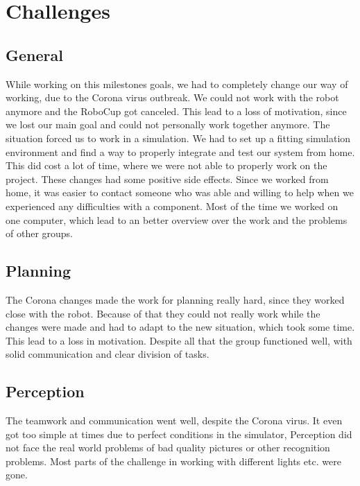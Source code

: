 \documentclass[main.tex]{subfiles}
\begin{document}
	
	\chapter{Challenges}

\section{General}

While working on this milestones goals, we had to completely change our way of working, due to the Corona virus outbreak.
We could not work with the robot anymore and the RoboCup got canceled. This lead to a loss of motivation, since we lost our main goal and could not personally work together anymore.
The situation forced us to work in a simulation. We had to set up a fitting simulation environment and find a way to properly integrate and test our system from home. This did cost a lot of time, where we were not able to properly work on the project.
These changes had some positive side effects. Since we worked from home, it was easier to contact someone who was able and willing to help when we experienced any difficulties with a component. Most of the time we worked on one computer, which lead to an better overview over the work and the problems of other groups.

\section{Planning}

The Corona changes made the work for planning really hard, since they worked close with the robot. Because of that they could not really work while the changes were made and had to adapt to the new situation, which took some time.
This lead to a loss in motivation. Despite all that the group functioned well, with solid communication and clear division of tasks.

\section{Perception}

The teamwork and communication went well, despite the Corona virus. It even got too simple at times due to perfect conditions in the simulator, Perception did not face the real world problems of bad quality pictures or other recognition problems. Most parts of the challenge in working with different lights etc. were gone.
\end{document}
